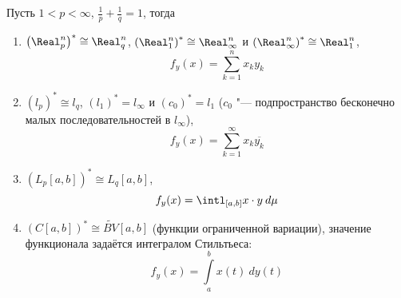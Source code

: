 \documentclass[main]{subfiles}
\begin{document}
\begin{exercise}
  Пусть \( 1 < p < \infty \), \( \frac{1}{p} + \frac{1}{q} = 1 \), тогда
  \begin{enumerate}
    \item \( {\left(\Real^n_p\right)}^* \cong \Real^n_q \),
      \( {\left(\Real^n_1\right)}^* \cong \Real^n_\infty \) и
      \( {\left(\Real^n_\infty\right)}^* \cong \Real^n_1 \),
      \[
	f_y(x) = \sum_{k=1}^n x_k y_k
      \]
    \item \( {(l_p)}^* \cong l_q \),
      \( {(l_1)}^* = l_\infty \) и \( {(c_0)}^* = l_1 \)
      (\( c_0 \) "--- подпространство бесконечно малых
      последовательностей в \( l_\infty \)),
      \[
	f_y(x) = \sum_{k = 1}^\infty x_k \overline{y_k}
      \]
    \item \( {\left( L_p[a, b] \right)}^* \cong L_q[a, b] \),
      \[
	f_y(x) = \intl_{[a,b]} x \cdot y \: d\mu
      \]
    \item \( {\left( C[a,b] \right)}^* \cong \widetilde{BV}[a,b] \)
      (функции ограниченной вариации),
      значение функционала задаётся интегралом Стильтьеса:
      \[
        f_y(x) = \int\limits_a^b x(t) \: dy(t)
      \]
  \end{enumerate}
\end{exercise}
\end{document}
